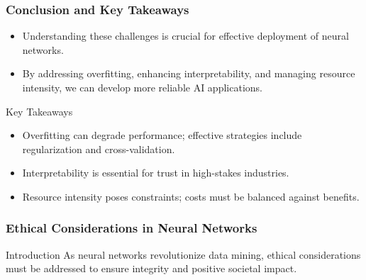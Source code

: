 \documentclass[aspectratio=169]{beamer}
\begin{document}
\begin{frame}[fragile]
    \frametitle{Conclusion and Key Takeaways}
    \begin{itemize}
        \item Understanding these challenges is crucial for effective deployment of neural networks.
        \item By addressing overfitting, enhancing interpretability, and managing resource intensity, we can develop more reliable AI applications.
    \end{itemize}
    \begin{block}{Key Takeaways}
        \begin{itemize}
            \item Overfitting can degrade performance; effective strategies include regularization and cross-validation.
            \item Interpretability is essential for trust in high-stakes industries.
            \item Resource intensity poses constraints; costs must be balanced against benefits.
        \end{itemize}
    \end{block}
\end{frame}

\begin{frame}[fragile]
    \frametitle{Ethical Considerations in Neural Networks}
    \begin{block}{Introduction}
        As neural networks revolutionize data mining, ethical considerations must be addressed to ensure integrity and positive societal impact.
    \end{block}
\end{frame}
\end{document}
